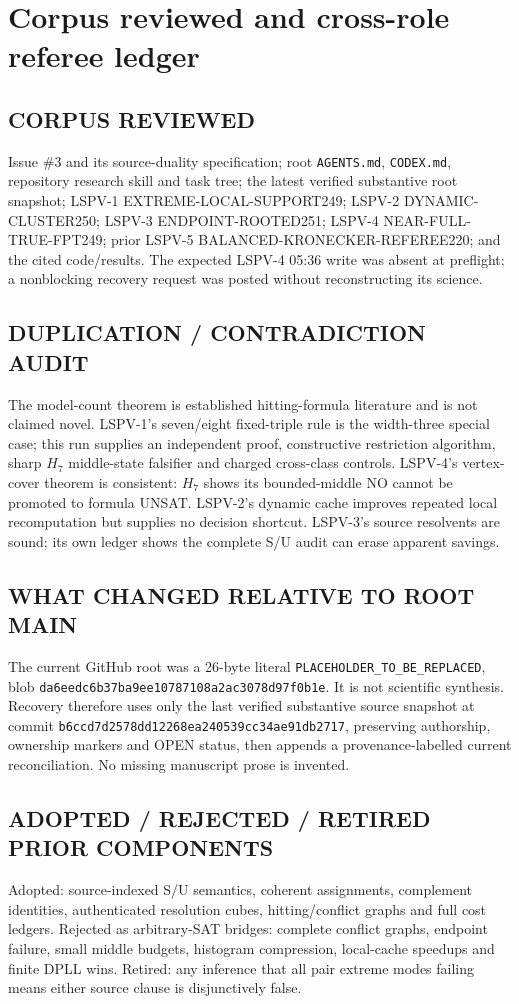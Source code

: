 \documentclass[11pt]{article}
\begin{document}
\section{Corpus reviewed and cross-role referee ledger}
\subsection*{CORPUS REVIEWED}
Issue \#3 and its source-duality specification; root \texttt{AGENTS.md},
\texttt{CODEX.md}, repository research skill and task tree; the latest verified
substantive root snapshot; LSPV-1 EXTREME-LOCAL-SUPPORT249; LSPV-2
DYNAMIC-CLUSTER250; LSPV-3 ENDPOINT-ROOTED251; LSPV-4
NEAR-FULL-TRUE-FPT249; prior LSPV-5 BALANCED-KRONECKER-REFEREE220; and the cited
code/results.  The expected LSPV-4 05:36 write was absent at preflight; a
nonblocking recovery request was posted without reconstructing its science.

\subsection*{DUPLICATION / CONTRADICTION AUDIT}
The model-count theorem is established hitting-formula literature and is not
claimed novel.  LSPV-1's seven/eight fixed-triple rule is the width-three special
case; this run supplies an independent proof, constructive restriction algorithm,
sharp $H_7$ middle-state falsifier and charged cross-class controls.  LSPV-4's
vertex-cover theorem is consistent: $H_7$ shows its bounded-middle NO cannot be
promoted to formula UNSAT.  LSPV-2's dynamic cache improves repeated local
recomputation but supplies no decision shortcut.  LSPV-3's source resolvents are
sound; its own ledger shows the complete S/U audit can erase apparent savings.

\subsection*{WHAT CHANGED RELATIVE TO ROOT MAIN}
The current GitHub root was a 26-byte literal
\texttt{PLACEHOLDER\_TO\_BE\_REPLACED}, blob
\texttt{da6eedc6b37ba9ee10787108a2ac3078d97f0b1e}.  It is not scientific synthesis.
Recovery therefore uses only the last verified substantive source snapshot at
commit \texttt{b6ccd7d2578dd12268ea240539cc34ae91db2717}, preserving authorship,
ownership markers and OPEN status, then appends a provenance-labelled current
reconciliation.  No missing manuscript prose is invented.

\subsection*{ADOPTED / REJECTED / RETIRED PRIOR COMPONENTS}
Adopted: source-indexed S/U semantics, coherent assignments, complement identities,
authenticated resolution cubes, hitting/conflict graphs and full cost ledgers.
Rejected as arbitrary-SAT bridges: complete conflict graphs, endpoint failure,
small middle budgets, histogram compression, local-cache speedups and finite DPLL
wins.  Retired: any inference that all pair extreme modes failing means either
source clause is disjunctively false.
\end{document}
